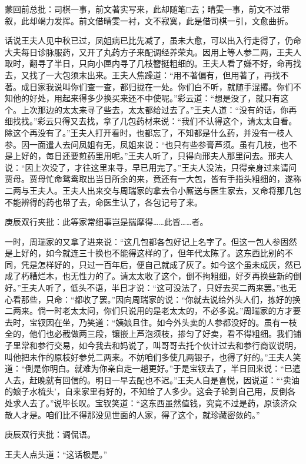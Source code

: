 \begin{parag}

    \begin{note}蒙回前总批：司棋一事，前文著实写来，此却随笔□去；晴雯一事，前文不过带叙，此却竭力发挥。前文借晴雯一衬，文不寂寞，此是借司棋一引，文愈曲折。\end{note}
\end{parag}

\begin{parag}

    话说王夫人见中秋已过，凤姐病已比先减了，虽未大愈，可以出入行走得了，仍命大夫每日诊脉服药，又开了丸药方子来配调经养荣丸。因用上等人参二两，王夫人取时，翻寻了半日，只向小匣内寻了几枝簪挺粗细的。王夫人看了嫌不好，命再找去，又找了一大包须末出来。王夫人焦躁道：“用不著偏有，但用著了，再找不著。成日家我说叫你们查一查，都归拢在一处。你们白不听，就随手混撂。你们不知他的好处，用起来得多少换买来还不中使呢。”彩云道：“想是没了，就只有这个。上次那边的太太来寻了些去，太太都给过去了。”王夫人道：“没有的话，你再细找找。”彩云只得又去找，拿了几包药材来说：“我们不认得这个，请太太自看。除这个再没有了。”王夫人打开看时，也都忘了，不知都是什么药，并没有一枝人参。因一面遣人去问凤姐有无，凤姐来说：“也只有些参膏芦须。虽有几枝，也不是上好的，每日还要煎药里用呢。”王夫人听了，只得向邢夫人那里问去。邢夫人说：“因上次没了，才往这里来寻，早已用完了。”王夫人没法，只得亲身过来请问贾母。贾母忙命鸳鸯取出当日所余的来，竟还有一大包，皆有手指头粗细的，遂称二两与王夫人。王夫人出来交与周瑞家的拿去令小厮送与医生家去，又命将那几包不能辨得的药也带了去，命医生认了，各包记号了来。\begin{note}庚辰双行夹批：此等家常细事岂是揣摩得……此皆……者。\end{note}
\end{parag}


\begin{parag}


    一时，周瑞家的又拿了进来说：“这几包都各包好记上名字了。但这一包人参固然是上好的，如今就连三十换也不能得这样的了，但年代太陈了。这东西比别的不同，凭是怎样好的，只过一百年后，便自己就成了灰了。如今这个虽未成灰，然已成了朽糟烂木，也无性力的了。请太太收了这个，倒不拘粗细，好歹再换些新的倒好。”王夫人听了，低头不语，半日才说：“这可没法了，只好去买二两来罢。”也无心看那些，只命：“都收了罢。”因向周瑞家的说：“你就去说给外头人们，拣好的换二两来。倘一时老太太问，你们只说用的是老太太的，不必多说。”周瑞家的方才要去时，宝钗因在坐，乃笑道：“姨娘且住。如今外头卖的人参都没好的。虽有一枝全的，他们也必截做两三段，镶嵌上芦泡须枝，掺匀了好卖，看不得粗细。我们铺子里常和参行交易，如今我去和妈说了，叫哥哥去托个伙计过去和参行商议说明，叫他把未作的原枝好参兑二两来。不妨咱们多使几两银子，也得了好的。”王夫人笑道：“倒是你明白。就难为你亲自走一趟更好。”于是宝钗去了，半日回来说：“已遣人去，赶晚就有回信的。明日一早去配也不迟。”王夫人自是喜悦，因说道：“‘卖油的娘子水梳头’，自来家里有好的，不知给了人多少。这会子轮到自己用，反倒各处求人去了。”说毕长叹。宝钗笑道：“这东西虽然值钱，究竟不过是药，原该济众散人才是。咱们比不得那没见世面的人家，得了这个，就珍藏密敛的。”\begin{note}庚辰双行夹批：调侃语。\end{note}王夫人点头道：“这话极是。”
\end{parag}


